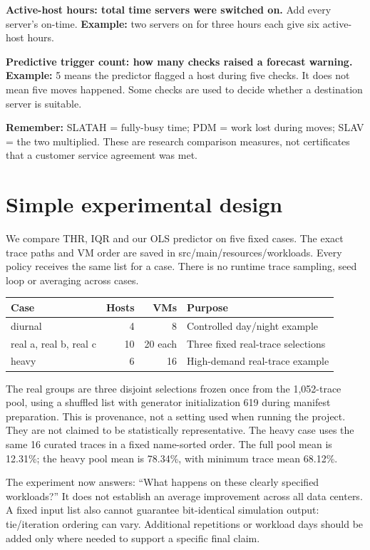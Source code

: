 \documentclass[11pt,a4paper]{article}
\begin{document}
\textbf{Active-host hours: total time servers were switched on.}
Add every server's on-time. \textbf{Example:} two servers on for three hours each give six active-host hours.

\textbf{Predictive trigger count: how many checks raised a forecast warning.}
\textbf{Example:} 5 means the predictor flagged a host during five checks. It does not mean five moves happened. Some checks are used to decide whether a destination server is suitable.

\textbf{Remember:} SLATAH = fully-busy time; PDM = work lost during moves; SLAV = the two multiplied. These are research comparison measures, not certificates that a customer service agreement was met.
\newpage
\section{Simple experimental design}
We compare THR, IQR and our OLS predictor on five fixed cases. The exact trace paths and VM order are saved in src/main/resources/workloads. Every policy receives the same list for a case. There is no runtime trace sampling, seed loop or averaging across cases.
\begin{center}\small\begin{tabular}{lrrl}\toprule Case & Hosts & VMs & Purpose\\\midrule
diurnal & 4 & 8 & Controlled day/night example\\
real a, real b, real c & 10 & 20 each & Three fixed real-trace selections\\
heavy & 6 & 16 & High-demand real-trace example\\\bottomrule\end{tabular}\end{center}
The real groups are three disjoint selections frozen once from the 1,052-trace pool, using a shuffled list with generator initialization 619 during manifest preparation. This is provenance, not a setting used when running the project. They are not claimed to be statistically representative. The heavy case uses the same 16 curated traces in a fixed name-sorted order. The full pool mean is 12.31\%; the heavy pool mean is 78.34\%, with minimum trace mean 68.12\%.

The experiment now answers: ``What happens on these clearly specified workloads?'' It does not establish an average improvement across all data centers. A fixed input list also cannot guarantee bit-identical simulation output: tie/iteration ordering can vary. Additional repetitions or workload days should be added only where needed to support a specific final claim.
\end{document}
